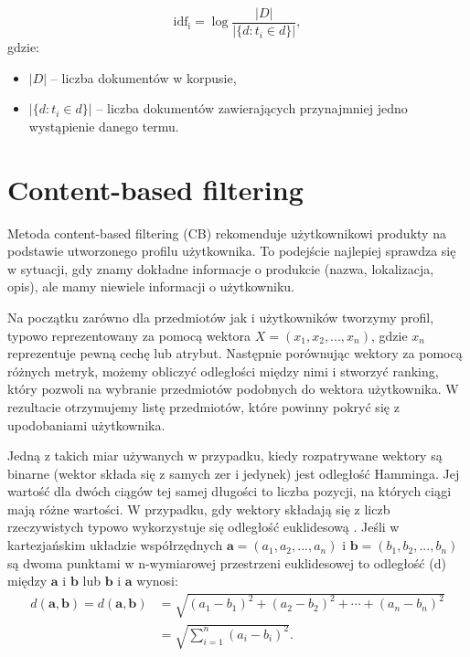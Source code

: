 \begin{equation*}
    \mathrm{idf_i} = \log \frac{|D|}{|\{d: t_i \in d\}|},
\end{equation*}
gdzie:
\begin{itemize}
    \item $|D|$ – liczba dokumentów w korpusie,
    \item $|\{d : t_i \in d\}|$ – liczba dokumentów zawierających przynajmniej jedno wystąpienie danego termu.

\end{itemize}

\section{Content-based filtering}
\label{chap:content}


Metoda content-based filtering (CB) rekomenduje użytkownikowi produkty na podstawie utworzonego profilu użytkownika. To podejście najlepiej sprawdza się w sytuacji, gdy znamy dokładne informacje o produkcie (nazwa, lokalizacja, opis), ale mamy niewiele informacji o użytkowniku.

Na początku zarówno dla przedmiotów jak i użytkowników tworzymy profil, typowo reprezentowany za pomocą wektora $X=(x_{1},x_{2},...,x_{n})$, gdzie $x_{n}$ reprezentuje pewną cechę lub atrybut. Następnie porównując wektory za pomocą różnych metryk, możemy obliczyć odległości między nimi i stworzyć ranking, który pozwoli na wybranie przedmiotów podobnych do wektora użytkownika. W rezultacie otrzymujemy listę przedmiotów, które powinny pokryć się z upodobaniami użytkownika.

Jedną z takich miar używanych w przypadku, kiedy rozpatrywane wektory są binarne (wektor składa się z samych zer i jedynek) jest odległość Hamminga. Jej wartość dla dwóch ciągów tej samej długości to liczba pozycji, na których ciągi mają różne wartości. 
W przypadku, gdy wektory składają się z liczb rzeczywistych typowo wykorzystuje się odległość euklidesową \cite{Similarityandrecommendersystems}.
Jeśli w kartezjańskim układzie współrzędnych $\mathbf{a}=(a_1,a_2,...,a_n)$ i $\mathbf{b}=(b_1,b_2,...,b_n)$ są dwoma punktami w n-wymiarowej przestrzeni euklidesowej to odległość (d) między $\mathbf{a}$ i $\mathbf{b}$ lub $\mathbf{b}$ i $\mathbf{a}$ wynosi:
\begin{equation}
    \begin{aligned}
        d(\mathbf{a},\mathbf{b}) = d(\mathbf{a},\mathbf{b}) & = \sqrt{(a_1-b_1)^2 + (a_2-b_2)^2 + \cdots + (a_n-b_n)^2} \\
& = \sqrt{\sum_{i=1}^n (a_i-b_i)^2}.
    \end{aligned}
\end{equation}

